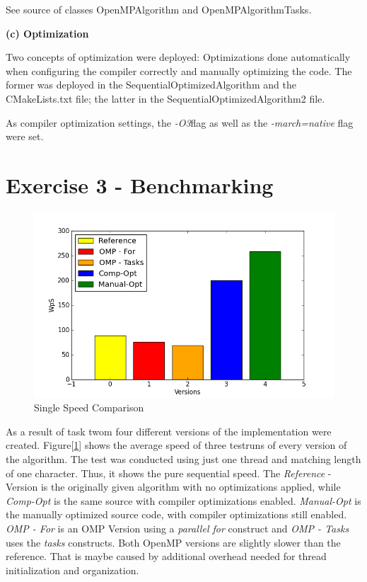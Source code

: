 \documentclass[a4paper,twoside,11pt]{article}
\begin{document}
See source of classes OpenMPAlgorithm and OpenMPAlgorithmTasks.

\textbf{(c) Optimization}

Two concepts of optimization were deployed: Optimizations done automatically when configuring the compiler correctly and manually optimizing the code. The former was deployed in the  SequentialOptimizedAlgorithm and the CMakeLists.txt file; the latter in the SequentialOptimizedAlgorithm2 file.

As compiler optimization settings, the \textit{-O3}flag as well as the \textit{-march=native} flag were set.

\section{Exercise 3 - Benchmarking}

\begin{figure}[hbtp]
\caption{Single Speed Comparison}
\centering
\label{fig:seq_comp}
\includegraphics[scale=0.8]{seq.png}
\end{figure}

As a result of task twom four different versions of the implementation were created. 
Figure[\ref{fig:seq_comp}] shows the average speed of three testruns of every version of the algorithm. The test was conducted using just one thread and matching length of one character. Thus, it shows the pure sequential speed.
The \textit{Reference} - Version is the originally given  algorithm with no optimizations applied, while \textit{Comp-Opt} is the same source with compiler optimizations enabled. \textit{Manual-Opt} is the manually optimized source code, with compiler optimizations still enabled.
\textit{OMP - For } is an OMP Version using a \textit{parallel for} construct and \textit{OMP - Tasks} uses the \textit{tasks} constructs.
Both OpenMP versions are slightly slower than the reference. That is maybe caused by additional overhead needed for thread initialization and  organization.
\end{document}
